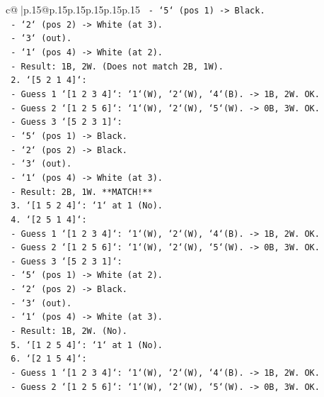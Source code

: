 \documentclass{article}
\begin{document}
{\begin{supertabular}{c@{$\;$}|p{.15\linewidth}@{}p{.15\linewidth}p{.15\linewidth}p{.15\linewidth}p{.15\linewidth}p{.15\linewidth}}
{{{\texttt{         {-} `5` (pos 1) {-}> Black.} \\
\texttt{         {-} `2` (pos 2) {-}> White (at 3).} \\
\texttt{         {-} `3` (out).} \\
\texttt{         {-} `1` (pos 4) {-}> White (at 2).} \\
\texttt{         {-} Result: 1B, 2W. (Does not match 2B, 1W).} \\
\texttt{    2. `{[}5 2 1 4{]}`:} \\
\texttt{       {-} Guess 1 `{[}1 2 3 4{]}`: `1`(W), `2`(W), `4`(B). {-}> 1B, 2W. OK.} \\
\texttt{       {-} Guess 2 `{[}1 2 5 6{]}`: `1`(W), `2`(W), `5`(W). {-}> 0B, 3W. OK.} \\
\texttt{       {-} Guess 3 `{[}5 2 3 1{]}`:} \\
\texttt{         {-} `5` (pos 1) {-}> Black.} \\
\texttt{         {-} `2` (pos 2) {-}> Black.} \\
\texttt{         {-} `3` (out).} \\
\texttt{         {-} `1` (pos 4) {-}> White (at 3).} \\
\texttt{         {-} Result: 2B, 1W. **MATCH!**} \\
\texttt{    3. `{[}1 5 2 4{]}`: `1` at 1 (No).} \\
\texttt{    4. `{[}2 5 1 4{]}`:} \\
\texttt{       {-} Guess 1 `{[}1 2 3 4{]}`: `1`(W), `2`(W), `4`(B). {-}> 1B, 2W. OK.} \\
\texttt{       {-} Guess 2 `{[}1 2 5 6{]}`: `1`(W), `2`(W), `5`(W). {-}> 0B, 3W. OK.} \\
\texttt{       {-} Guess 3 `{[}5 2 3 1{]}`:} \\
\texttt{         {-} `5` (pos 1) {-}> White (at 2).} \\
\texttt{         {-} `2` (pos 2) {-}> Black.} \\
\texttt{         {-} `3` (out).} \\
\texttt{         {-} `1` (pos 4) {-}> White (at 3).} \\
\texttt{         {-} Result: 1B, 2W. (No).} \\
\texttt{    5. `{[}1 2 5 4{]}`: `1` at 1 (No).} \\
\texttt{    6. `{[}2 1 5 4{]}`:} \\
\texttt{       {-} Guess 1 `{[}1 2 3 4{]}`: `1`(W), `2`(W), `4`(B). {-}> 1B, 2W. OK.} \\
\texttt{       {-} Guess 2 `{[}1 2 5 6{]}`: `1`(W), `2`(W), `5`(W). {-}> 0B, 3W. OK.} \\
}}}
\end{supertabular}}
\end{document}

